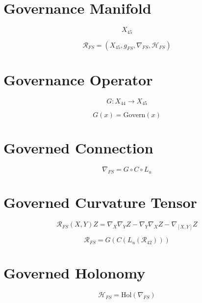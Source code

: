 
\section*{Governance Manifold}

\[
X_{45}
\]

\[
\mathcal{R}_{FS} = (X_{45}, g_{FS}, \nabla_{FS}, \mathcal{H}_{FS})
\]


\section*{Governance Operator}

\[
G : X_{44} \to X_{45}
\]

\[
G(x) = \mathrm{Govern}(x)
\]


\section*{Governed Connection}

\[
\nabla_{FS} = G \circ C \circ L_u
\]


\section*{Governed Curvature Tensor}

\[
\mathcal{R}_{FS}(X,Y)Z
= \nabla_X \nabla_Y Z
- \nabla_Y \nabla_X Z
- \nabla_{[X,Y]} Z
\]

\[
\mathcal{R}_{FS}
= G(C(L_u(\mathcal{R}_{42})))
\]


\section*{Governed Holonomy}

\[
\mathcal{H}_{FS}
= \mathrm{Hol}(\nabla_{FS})
\]



